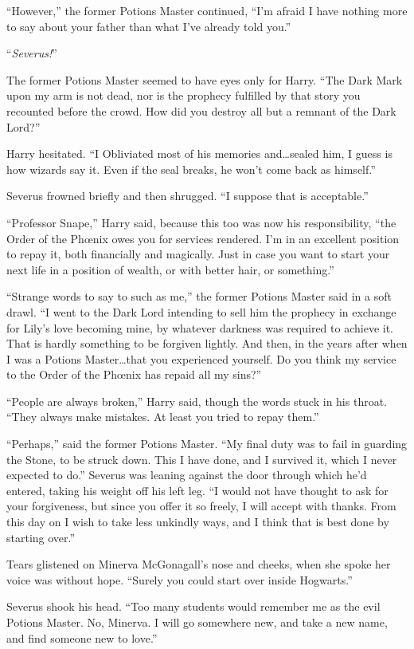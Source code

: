 “However,” the former Potions Master continued,
“I’m afraid I have nothing more to say about your father than what I’ve already told you.”

“\emph{Severus!}”

The former Potions Master seemed to have eyes only for Harry.
“The Dark Mark upon my arm is not dead, nor is the prophecy fulfilled by that story you recounted before the crowd. How did you destroy all but a remnant of the Dark Lord?”

Harry hesitated.
“I Obliviated most of his memories and…sealed him, I guess is how wizards say it. Even if the seal breaks, he won’t come back as himself.”

Severus frowned briefly and then shrugged.
“I suppose that is acceptable.”

“Professor Snape,” Harry said, because this too was now his responsibility, “the Order of the Phœnix owes you for services rendered. I’m in an excellent position to repay it, both financially and magically. Just in case you want to start your next life in a position of wealth, or with better hair, or something.”

“Strange words to say to such as me,” the former Potions Master said in a soft drawl.
“I went to the Dark Lord intending to sell him the prophecy in exchange for Lily’s love becoming mine, by whatever darkness was required to achieve it. That is hardly something to be forgiven lightly. And then, in the years after when I was a Potions Master…that you experienced yourself. Do you think my service to the Order of the Phœnix has repaid all my sins?”

“People are always broken,” Harry said, though the words stuck in his throat.
“They always make mistakes. At least you tried to repay them.”

“Perhaps,” said the former Potions Master.
“My final duty was to fail in guarding the Stone, to be struck down. This I have done, and I survived it, which I never expected to do.” Severus was leaning against the door through which he’d entered, taking his weight off his left leg.
“I would not have thought to ask for your forgiveness, but since you offer it so freely, I will accept with thanks. From this day on I wish to take less unkindly ways, and I think that is best done by starting over.”

Tears glistened on Minerva McGonagall’s nose and cheeks, when she spoke her voice was without hope.
“Surely you could start over inside Hogwarts.”

Severus shook his head.
“Too many students would remember me as the evil Potions Master. No, Minerva. I will go somewhere new, and take a new name, and find someone new to love.”

